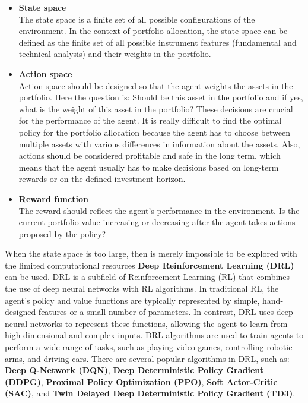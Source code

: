 \begin{itemize}
    \item \textbf{State space}\\
    The state space is a finite set of all possible configurations of the environment.
    In the context of portfolio allocation, the state space can be defined as the finite set of all possible instrument features (fundamental and technical analysis) and their weights in the portfolio.
    \item \textbf{Action space} \\
    Action space should be designed so that the agent weights the assets in the portfolio.
    Here the question is: Should be this asset in the portfolio and if yes, what is the weight of this asset in the portfolio?
    These decisions are crucial for the performance of the agent.
    It is really difficult to find the optimal policy for the portfolio allocation because the agent has to choose between multiple assets with various differences in information about the assets.
    Also, actions should be considered profitable and safe in the long term, which means that the agent usually has to make decisions based on long-term rewards or on the defined investment horizon.
    \item \textbf{Reward function}\\
    The reward should reflect the agent's performance in the environment.
    Is the current portfolio value increasing or decreasing after the agent takes actions proposed by the policy?
\end{itemize}

When the state space is too large, then is merely impossible to be explored with the limited computational resources \textbf{Deep Reinforcement Learning (DRL)} can be used.
DRL is a subfield of Reinforcement Learning (RL) that combines the use of deep neural networks with RL algorithms.
In traditional RL, the agent's policy and value functions are typically represented by simple, hand-designed features or a small number of parameters.
In contrast, DRL uses deep neural networks to represent these functions, allowing the agent to learn from high-dimensional and complex inputs.
DRL algorithms are used to train agents to perform a wide range of tasks, such as playing video games, controlling robotic arms, and driving cars.
There are several popular algorithms in DRL, such as:
\textbf{Deep Q-Network (DQN)},
\textbf{Deep Deterministic Policy Gradient (DDPG)},
\textbf{Proximal Policy Optimization (PPO)},
\textbf{Soft Actor-Critic (SAC)},
and \textbf{Twin Delayed Deep Deterministic Policy Gradient (TD3)}.


